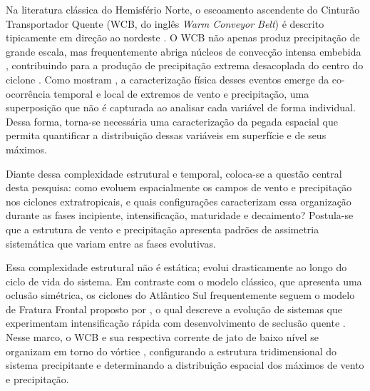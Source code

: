 Na literatura clássica do Hemisfério Norte, o escoamento ascendente do Cinturão Transportador Quente (WCB, do inglês \textit{Warm Conveyor Belt})
é descrito tipicamente em direção ao nordeste \citep{blanchard2021warm}. O WCB não apenas produz precipitação de grande escala, mas frequentemente abriga núcleos de convecção intensa embebida \citep{oertel2021warm}, contribuindo para a produção de precipitação extrema desacoplada do centro do ciclone \citep{naud2020evaluation}. Como mostram \citet{chen2025characteristics}, a caracterização física desses eventos emerge da co-ocorrência temporal e local de extremos de vento e precipitação, uma superposição que não é capturada ao analisar cada variável de forma individual. Dessa forma, torna-se necessária uma caracterização da pegada espacial que permita quantificar a distribuição dessas variáveis em superfície e de seus máximos.


Diante dessa complexidade estrutural e temporal, coloca-se a questão central desta pesquisa: como evoluem espacialmente os campos de vento e precipitação nos ciclones extratropicais, e quais configurações caracterizam essa organização durante as fases incipiente, intensificação, maturidade e decaimento?
Postula-se que a estrutura de vento e precipitação apresenta padrões de assimetria sistemática que variam entre as fases evolutivas.


Essa complexidade estrutural não é estática; evolui drasticamente ao longo do ciclo de vida do sistema. Em contraste com o modelo clássico, que apresenta uma oclusão simétrica, os ciclones do Atlântico Sul frequentemente seguem o modelo de Fratura Frontal proposto por \citet{shapiro1990life}, o qual descreve a evolução de sistemas que experimentam intensificação rápida com desenvolvimento de seclusão quente \citep{shapiro1999bridge}. Nesse marco, o WCB e sua respectiva corrente de jato de baixo nível se organizam em torno do vórtice \citep{browning1986conceptual}, configurando a estrutura tridimensional do sistema precipitante e determinando a distribuição espacial dos máximos de vento e precipitação.

